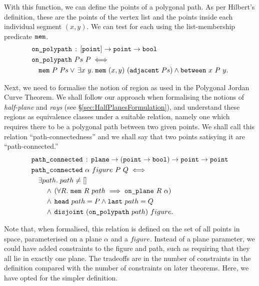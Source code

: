 With this function, we can define the points of a polygonal path. As per Hilbert's definition, these are the points of the vertex list and the points inside each individual segment $(x,y)$. We can test for each using the list-membership predicate $\texttt{mem}$.
\begin{equation}\label{eq:OnPolyPath}
  \begin{split}
    &\code{on\_polypath}\,:\,[\code{point}] \rightarrow \code{point} \rightarrow \code{bool}\\
    &\code{on\_polypath}\ Ps\ P \iff \\
    &\quad\code{mem}\ P\ Ps\vee\,\exists x\ y.\; \code{mem}\ (x,y)\ (\code{adjacent}\ Ps) \wedge \between{x}{P}{y}.
  \end{split}
\end{equation}

Next, we need to formalise the notion of region as used in the Polygonal Jordan Curve Theorem. We shall follow our approach when formalising the notions of \emph{half-plane} and \emph{rays} (see \S\ref{sec:HalfPlanesFormulation}), and understand these regions as equivalence classes under a suitable relation, namely one which requires there to be a polygonal path between two given points. We shall call this relation ``path-connectedness'' and we shall say that two points satisying it are ``path-connected.''
\begin{align*}
  &\code{path\_connected}\,:\,\code{plane}\rightarrow(\code{point} \rightarrow \code{bool}) \rightarrow    \code{point} \rightarrow \code{point}\\
  &\code{path\_connected}\ \alpha\ figure\ P\ Q \iff\\
  &\quad\exists path.\; path \neq []\\
  &\qquad\wedge\,(\forall R.\ \code{mem}\ R\ path \implies \onplane{R}{\alpha})\\
  &\qquad\wedge\,\code{head}\ path = P \wedge \code{last}\ path = Q\\
  &\qquad\wedge\,\code{disjoint}\ (\code{on\_polypath}\ path)\ figure.
\end{align*}

Note that, when formalised, this relation is defined on the set of all points in space, parameterised on a plane $\alpha$ and a $figure$. Instead of a plane parameter, we could have added constraints to the figure and path, such as requiring that they all lie in exactly one plane. The tradeoffs are in the number of constraints in the definition compared with the number of constraints on later theorems. Here, we have opted for the simpler definition.

